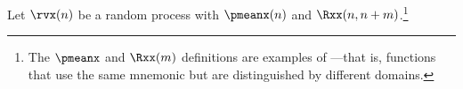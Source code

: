 \begin{definition}
\label{def:mean_wss}
\label{def:Rxx_wss}
\label{def:Rxy_wss}
Let $\rvx(n)$ be a random process with  $\pmeanx(n)$ and
 $\Rxx(n,n+m)$.\footnote{
  The $\pmeanx$ and $\Rxx(m)$ definitions  are examples
  of ---that is, functions that use the same 
  mnemonic but are distinguished by different domains.
  }
\end{definition}

